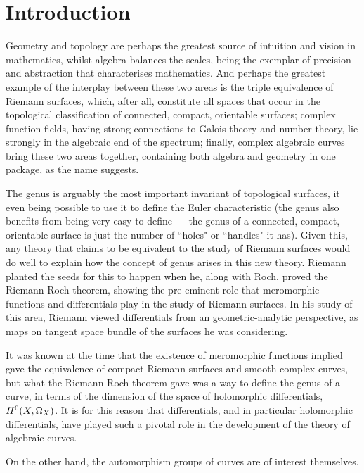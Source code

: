 \chapter{Introduction} \label{Chapter:introduction}


Geometry and topology are perhaps the greatest source of intuition and vision in mathematics, whilst algebra balances the scales, being the exemplar of precision and abstraction that characterises mathematics. 
And perhaps the greatest example of the interplay between these two areas is the triple equivalence of Riemann surfaces, which, after all, constitute all spaces that occur in the topological classification of connected, compact, orientable surfaces; complex function fields, having strong connections to Galois theory and number theory, lie strongly in the algebraic end of the spectrum; finally, complex algebraic curves bring these two areas together, containing both algebra and geometry in one package, as the name suggests.

The genus is arguably the most important invariant of topological surfaces, it even being possible to use it to define the Euler characteristic (the genus also benefits from being very easy to define --- the genus of a connected, compact, orientable surface is just the number of ``holes" or ``handles" it has).
Given this, any theory that claims to be equivalent to the study of Riemann surfaces would do well to explain how the concept of genus arises in this new theory.
Riemann planted the seeds for this to happen when he, along with Roch, proved the Riemann-Roch theorem, showing the pre-eminent role that meromorphic functions and differentials play in the study of Riemann surfaces.
In his study of this area, Riemann viewed differentials from an geometric-analytic perspective, as maps on tangent space bundle of the surfaces he was considering.

It was known at the time that the existence of meromorphic functions implied gave the equivalence of compact Riemann surfaces and smooth complex curves, but what the Riemann-Roch theorem gave was a way to define the genus of a curve, in terms of the dimension of the space of holomorphic differentials, ${H^0(X,\Omega_X)}$.
It is for this reason that differentials, and in particular holomorphic differentials, have played such a pivotal role in the development of the theory of algebraic curves.

On the other hand, the automorphism groups of curves are of interest themselves. 

